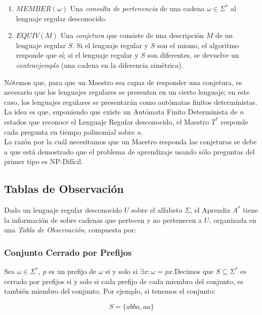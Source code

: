 \documentclass[12pt]{amsart}
\begin{document}
\begin{enumerate}
    \item $MEMBER(\omega)$ Una \textit{consulta de pertenencia} de una cadena $\omega \in \Sigma^{*}$ al lenguaje regular desconocido.
    \item $EQUIV(M)$ Una \textit{conjetura} que consiste de una descripción $M$ de un lenguaje regular $S$. Si el lenguaje regular y $S$ son el mismo, el algoritmo responde que sí; si el lenguaje regular y $S$ son diferentes, se devuelve un \textit{contraejemplo} (una cadena en la diferencia simétrica). \\
\end{enumerate}

Nótemos que, para que un Maestro sea capaz de responder una conjetura, es necesario que los lenguajes regulares se presenten en un cierto lenguaje; en este caso, los lenguajes regulares se presentarán como autómatas finitos deterministas. La idea es que, suponiendo que existe un Autómata Finito Determinista de $n$ estados que reconoce el Lenguaje Regular desconocido, el Maestro $T^{*}$ responde cada pregunta en tiempo polinomial sobre $n$. \\

La razón por la cuál necesitamos que un Maestro responda las conjeturas se debe a que está demostrado que el problema de aprendizaje usando sólo preguntas del primer tipo es NP-Difícil.

\subsection{Tablas de Observación}

Dado un lenguaje regular desconocido $U$ sobre el alfabeto $\Sigma$, el Aprendiz $A^{*}$ tiene la información de sobre cadenas que pertecen y no pertenecen a $U$, organizada en una \textit{Tabla de Observación}, compuesta por:

\subsubsection{Conjunto Cerrado por Prefijos}

Sea $\omega \in \Sigma^{*}$, $p$ es un prefijo de $\omega$ si y solo si $\exists x: \omega = px$.Decimos que $S \subseteq \Sigma^{*}$ es cerrado por prefijos si y solo si cada prefijo de cada miembro del conjunto, es también miembro del conjunto. Por ejemplo, si tenemos el conjunto:

\[ S = \{ abba, aa \} \]
\end{document}
